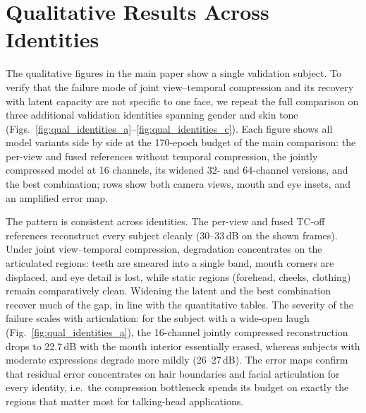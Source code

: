 
\section{Qualitative Results Across Identities}
\label{sec:appendix_identities}

The qualitative figures in the main paper show a single validation subject.
To verify that the failure mode of joint view--temporal compression and its
recovery with latent capacity are not specific to one face, we repeat the
full comparison on three additional validation identities spanning gender and
skin tone (Figs.~\ref{fig:qual_identities_a}--\ref{fig:qual_identities_c}).
Each figure shows all model variants side by side at the 170-epoch budget of
the main comparison: the per-view and fused references without temporal
compression, the jointly compressed model at 16 channels, its widened 32- and
64-channel versions, and the best combination; rows show both camera views,
mouth and eye insets, and an amplified error map.

The pattern is consistent across identities. The per-view and fused
TC-off references reconstruct every subject cleanly (30--33\,dB on the shown
frames). Under joint view--temporal compression, degradation concentrates on
the articulated regions: teeth are smeared into a single band, mouth corners
are displaced, and eye detail is lost, while static regions (forehead,
cheeks, clothing) remain comparatively clean. Widening the latent and the
best combination recover much of the gap, in line with the quantitative
tables. The severity of the failure scales with articulation: for the
subject with a wide-open laugh (Fig.~\ref{fig:qual_identities_a}), the
16-channel jointly compressed reconstruction drops to 22.7\,dB with the mouth
interior essentially erased, whereas subjects with moderate expressions
degrade more mildly (26--27\,dB). The error maps confirm that residual error
concentrates on hair boundaries and facial articulation for every identity,
i.e.\ the compression bottleneck spends its budget on exactly the regions
that matter most for talking-head applications.

